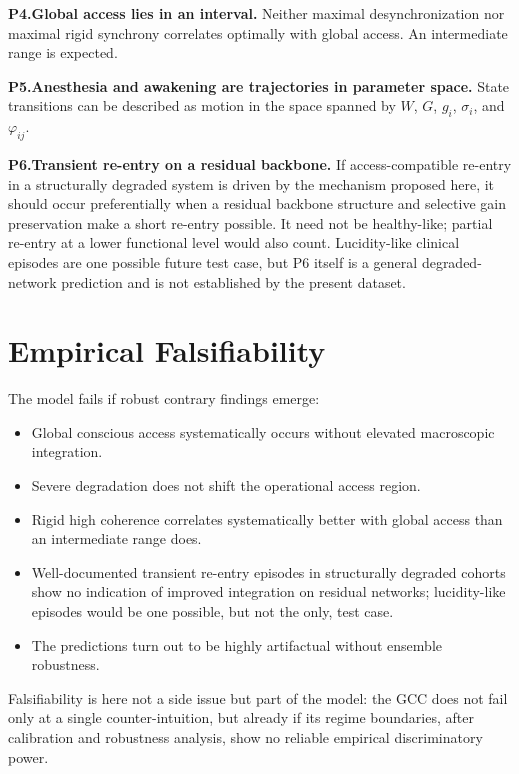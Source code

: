 ﻿\documentclass[11pt,a4paper]{article}
\theoremstyle{plain}
\theoremstyle{definition}
\theoremstyle{remark}
\begin{document}
\medskip
\noindent\textbf{P4.\;Global access lies in an interval.}\quad
Neither maximal desynchronization nor maximal rigid synchrony correlates optimally with global access. An intermediate range is expected.

\medskip
\noindent\textbf{P5.\;Anesthesia and awakening are trajectories in parameter space.}\quad
State transitions can be described as motion in the space spanned by $W$, $G$, $g_i$, $\sigma_i$, and $\varphi_{ij}$.

\medskip
\noindent\textbf{P6.\;Transient re-entry on a residual backbone.}\quad
If access-compatible re-entry in a structurally degraded system is driven by the mechanism proposed here, it should occur preferentially when a residual backbone structure and selective gain preservation make a short re-entry possible. It need not be healthy-like; partial re-entry at a lower functional level would also count. Lucidity-like clinical episodes are one possible future test case, but P6 itself is a general degraded-network prediction and is not established by the present dataset.


\section{Empirical Falsifiability}
\label{sec:falsifizierbarkeit}

The model fails if robust contrary findings emerge:
\begin{itemize}
\item Global conscious access systematically occurs without elevated macroscopic integration.
\item Severe degradation does not shift the operational access region.
\item Rigid high coherence correlates systematically better with global access than an intermediate range does.
\item Well-documented transient re-entry episodes in structurally degraded cohorts show no indication of improved integration on residual networks; lucidity-like episodes would be one possible, but not the only, test case.
\item The predictions turn out to be highly artifactual without ensemble robustness.
\end{itemize}

Falsifiability is here not a side issue but part of the model: the GCC does not fail only at a single counter-intuition, but already if its regime boundaries, after calibration and robustness analysis, show no reliable empirical discriminatory power.
\end{document}
